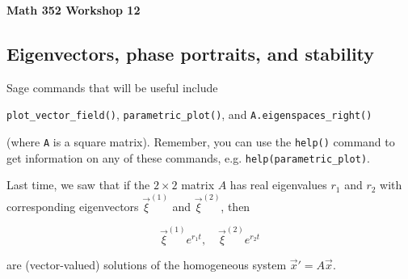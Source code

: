 \documentclass[12pt,twoside]{exam}
\begin{document}
\noindent
\textbf{{\large Math 352 \hfill Workshop 12}}

\vspace{2ex}

\noindent
{}

\noindent

\newcommand{\longlines}{\setlength{\answerlinelength}{0.7\linewidth}}
\newcommand{\medlines}{\setlength{\answerlinelength}{0.45\linewidth}}
\newcommand{\shortlines}{\setlength{\answerlinelength}{0.2\linewidth}}


\subsection*{Eigenvectors, phase portraits, and stability}

Sage commands that will be useful include

\texttt{plot\_vector\_field()}, \texttt{parametric\_plot()}, and
\texttt{A.eigenspaces\_right()} 

(where \texttt{A} is a square matrix).
Remember, you can use the \texttt{help()} command to get information on
any of these commands, e.g. \texttt{help(parametric\_plot)}.

Last time, we saw that if the $2 \times 2$ matrix $A$ has real
eigenvalues $r_1$ and $r_2$ with corresponding eigenvectors
$\vec{\xi}^{(1)}$ and $\vec{\xi}^{(2)}$, then

\begin{equation*}
    \vec{\xi}^{(1)} e^{r_1 t}, \quad \vec{\xi}^{(2)} e^{r_2 t}
\end{equation*}

are (vector-valued) solutions of the homogeneous system
$\vec{x}' = A\vec{x}.$
\end{document}
